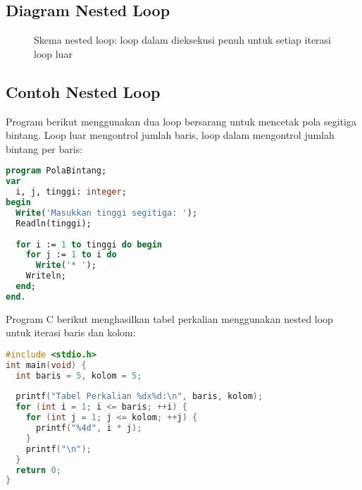\documentclass[../main.tex]{subfiles}
\begin{document}
\subsection{Diagram Nested Loop}
\begin{figure}[H]
  \centering
  \caption{Skema nested loop: loop dalam dieksekusi penuh untuk setiap iterasi loop luar}
\end{figure}

\subsection{Contoh Nested Loop}

Program berikut menggunakan dua loop bersarang untuk mencetak pola segitiga bintang. Loop luar mengontrol jumlah baris, loop dalam mengontrol jumlah bintang per baris:

\begin{lstlisting}[language=Pascal, caption={Pola segitiga dengan nested loop (Pascal)}]
program PolaBintang;
var
  i, j, tinggi: integer;
begin
  Write('Masukkan tinggi segitiga: ');
  Readln(tinggi);
  
  for i := 1 to tinggi do begin
    for j := 1 to i do
      Write('* ');
    Writeln;
  end;
end.
\end{lstlisting}

Program C berikut menghasilkan tabel perkalian menggunakan nested loop untuk iterasi baris dan kolom:

\begin{lstlisting}[language=C, caption={Tabel perkalian dengan nested loop (C)}]
#include <stdio.h>
int main(void) {
  int baris = 5, kolom = 5;
  
  printf("Tabel Perkalian %dx%d:\n", baris, kolom);
  for (int i = 1; i <= baris; ++i) {
    for (int j = 1; j <= kolom; ++j) {
      printf("%4d", i * j);
    }
    printf("\n");
  }
  return 0;
}
\end{lstlisting}
\end{document}
